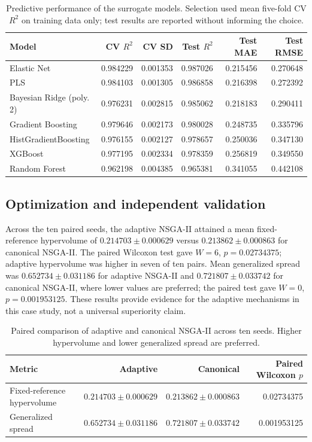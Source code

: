 \documentclass[preprint,12pt]{elsarticle}
\begin{document}
\begin{table}[htbp]
\centering\small
\caption{Predictive performance of the surrogate models. Selection used mean five-fold CV $R^2$ on training data only; test results are reported without informing the choice.}
\label{tab:surrogate}
\begin{tabular}{lrrrrr}
\toprule
Model & CV $R^2$ & CV SD & Test $R^2$ & Test MAE & Test RMSE\\
\midrule
Elastic Net & 0.984229 & 0.001353 & 0.987026 & 0.215456 & 0.270648\\
PLS & 0.984103 & 0.001305 & 0.986858 & 0.216398 & 0.272392\\
Bayesian Ridge (poly. 2) & 0.976231 & 0.002815 & 0.985062 & 0.218183 & 0.290411\\
Gradient Boosting & 0.979646 & 0.002173 & 0.980028 & 0.248735 & 0.335796\\
HistGradientBoosting & 0.976155 & 0.002127 & 0.978657 & 0.250036 & 0.347130\\
XGBoost & 0.977195 & 0.002334 & 0.978359 & 0.256819 & 0.349550\\
Random Forest & 0.962198 & 0.004385 & 0.965381 & 0.341055 & 0.442108\\
\bottomrule
\end{tabular}
\end{table}

\subsection{Optimization and independent validation}
Across the ten paired seeds, the adaptive NSGA-II attained a mean fixed-reference hypervolume of $0.214703\pm0.000629$ versus $0.213862\pm0.000863$ for canonical NSGA-II. The paired Wilcoxon test gave $W=6$, $p=0.02734375$; adaptive hypervolume was higher in seven of ten pairs. Mean generalized spread was $0.652734\pm0.031186$ for adaptive NSGA-II and $0.721807\pm0.033742$ for canonical NSGA-II, where lower values are preferred; the paired test gave $W=0$, $p=0.001953125$. These results provide evidence for the adaptive mechanisms in this case study, not a universal superiority claim.

\begin{table}[htbp]
\centering
\caption{Paired comparison of adaptive and canonical NSGA-II across ten seeds. Higher hypervolume and lower generalized spread are preferred.}
\label{tab:nsga-comparison}
\begin{tabular}{lrrr}
\toprule
Metric & Adaptive & Canonical & Paired Wilcoxon $p$\\
\midrule
Fixed-reference hypervolume & $0.214703\pm0.000629$ & $0.213862\pm0.000863$ & 0.02734375\\
Generalized spread & $0.652734\pm0.031186$ & $0.721807\pm0.033742$ & 0.001953125\\
\bottomrule
\end{tabular}
\end{table}
\end{document}
